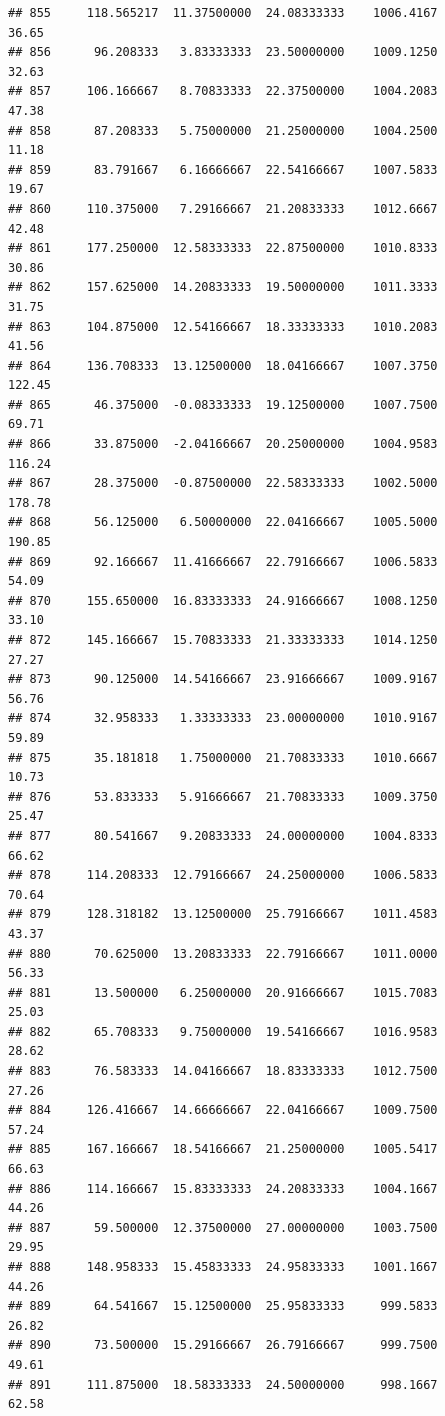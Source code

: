 \documentclass[
]{article}
\begin{document}
\begin{verbatim}
## 855     118.565217  11.37500000  24.08333333    1006.4167       36.65
## 856      96.208333   3.83333333  23.50000000    1009.1250       32.63
## 857     106.166667   8.70833333  22.37500000    1004.2083       47.38
## 858      87.208333   5.75000000  21.25000000    1004.2500       11.18
## 859      83.791667   6.16666667  22.54166667    1007.5833       19.67
## 860     110.375000   7.29166667  21.20833333    1012.6667       42.48
## 861     177.250000  12.58333333  22.87500000    1010.8333       30.86
## 862     157.625000  14.20833333  19.50000000    1011.3333       31.75
## 863     104.875000  12.54166667  18.33333333    1010.2083       41.56
## 864     136.708333  13.12500000  18.04166667    1007.3750      122.45
## 865      46.375000  -0.08333333  19.12500000    1007.7500       69.71
## 866      33.875000  -2.04166667  20.25000000    1004.9583      116.24
## 867      28.375000  -0.87500000  22.58333333    1002.5000      178.78
## 868      56.125000   6.50000000  22.04166667    1005.5000      190.85
## 869      92.166667  11.41666667  22.79166667    1006.5833       54.09
## 870     155.650000  16.83333333  24.91666667    1008.1250       33.10
## 872     145.166667  15.70833333  21.33333333    1014.1250       27.27
## 873      90.125000  14.54166667  23.91666667    1009.9167       56.76
## 874      32.958333   1.33333333  23.00000000    1010.9167       59.89
## 875      35.181818   1.75000000  21.70833333    1010.6667       10.73
## 876      53.833333   5.91666667  21.70833333    1009.3750       25.47
## 877      80.541667   9.20833333  24.00000000    1004.8333       66.62
## 878     114.208333  12.79166667  24.25000000    1006.5833       70.64
## 879     128.318182  13.12500000  25.79166667    1011.4583       43.37
## 880      70.625000  13.20833333  22.79166667    1011.0000       56.33
## 881      13.500000   6.25000000  20.91666667    1015.7083       25.03
## 882      65.708333   9.75000000  19.54166667    1016.9583       28.62
## 883      76.583333  14.04166667  18.83333333    1012.7500       27.26
## 884     126.416667  14.66666667  22.04166667    1009.7500       57.24
## 885     167.166667  18.54166667  21.25000000    1005.5417       66.63
## 886     114.166667  15.83333333  24.20833333    1004.1667       44.26
## 887      59.500000  12.37500000  27.00000000    1003.7500       29.95
## 888     148.958333  15.45833333  24.95833333    1001.1667       44.26
## 889      64.541667  15.12500000  25.95833333     999.5833       26.82
## 890      73.500000  15.29166667  26.79166667     999.7500       49.61
## 891     111.875000  18.58333333  24.50000000     998.1667       62.58

\end{verbatim}
\end{document}
